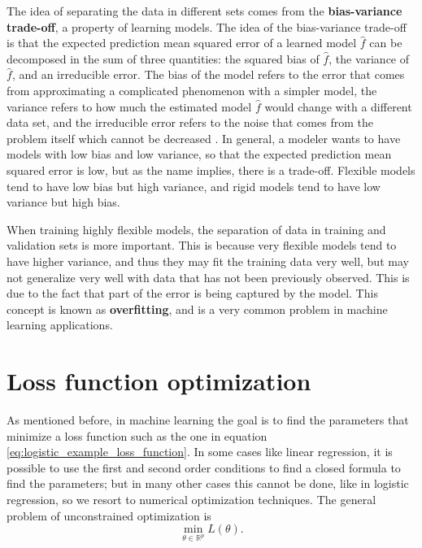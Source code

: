 The idea of separating the data in different sets comes from the \textbf{bias-variance trade-off}, a property of learning models. The idea of the bias-variance trade-off is that the expected prediction mean squared error of a learned model $\hat{f}$ can be decomposed in the sum of three quantities: the squared bias of $\hat{f}$, the variance of $\hat{f}$, and an irreducible error. The bias of the model refers to the error that comes from approximating a complicated phenomenon with a simpler model, the variance refers to how much the estimated model $\hat{f}$ would change with a different data set, and the irreducible error refers to the noise that comes from the problem itself which cannot be decreased \cite{friedman2001elements} \cite{james2013introduction}. In general, a modeler wants to have models with low bias and low variance, so that the expected prediction mean squared error is low, but as the name implies, there is a trade-off. Flexible models tend to have low bias but high variance, and rigid models tend to have low variance but high bias.

When training highly flexible models, the separation of data in training and validation sets is more important. This is because very flexible models tend to have higher variance, and thus they may fit the training data very well, but may not generalize very well with data that has not been previously observed. This is due to the fact that part of the error is being captured by the model. This concept is known as \textbf{overfitting}, and is a very common problem in machine learning applications. 




\section{Loss function optimization}

As mentioned before, in machine learning the goal is to find the parameters that minimize a loss function such as the one in equation \eqref{eq:logistic_example_loss_function}. In some cases like linear regression, it is possible to use the first and second order conditions to find a closed formula to find the parameters; but in many other cases this cannot be done, like in logistic regression, so we resort to numerical optimization techniques. The general problem of unconstrained optimization \cite{nocedal2006numerical} is
\begin{equation}
  \min_{\theta \in \mathbb{R}^p} L(\theta).
\end{equation}


